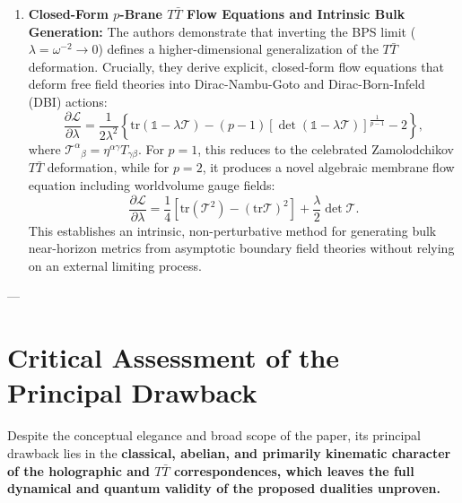 \documentclass[11pt,a4paper]{article}
\begin{document}
\begin{enumerate}
    \item \textbf{Closed-Form $p$-Brane $T\bar{T}$ Flow Equations and Intrinsic Bulk Generation:}
    The authors demonstrate that inverting the BPS limit ($\lambda = \omega^{-2} \to 0$) defines a higher-dimensional generalization of the $T\bar{T}$ deformation. Crucially, they derive explicit, closed-form flow equations that deform free field theories into Dirac-Nambu-Goto and Dirac-Born-Infeld (DBI) actions:
    \begin{equation}
        \frac{\partial \mathcal{L}}{\partial \lambda} = \frac{1}{2\lambda^2} \left\{ \mathrm{tr}(\mathbb{1} - \lambda \mathcal{T}) - (p-1) \left[ \det(\mathbb{1} - \lambda \mathcal{T}) \right]^{\frac{1}{p-1}} - 2 \right\},
    \end{equation}
    where $\mathcal{T}^\alpha{}_\beta = \eta^{\alpha\gamma} T_{\gamma\beta}$. For $p=1$, this reduces to the celebrated Zamolodchikov $T\bar{T}$ deformation, while for $p=2$, it produces a novel algebraic membrane flow equation including worldvolume gauge fields:
    \begin{equation}
        \frac{\partial \mathcal{L}}{\partial \lambda} = \frac{1}{4} \left[ \mathrm{tr}(\mathcal{T}^2) - (\mathrm{tr}\mathcal{T})^2 \right] + \frac{\lambda}{2} \det \mathcal{T}.
    \end{equation}
    This establishes an intrinsic, non-perturbative method for generating bulk near-horizon metrics from asymptotic boundary field theories without relying on an external limiting process.
\end{enumerate}

---

\section{Critical Assessment of the Principal Drawback}
Despite the conceptual elegance and broad scope of the paper, its principal drawback lies in the \textbf{classical, abelian, and primarily kinematic character of the holographic and $T\bar{T}$ correspondences, which leaves the full dynamical and quantum validity of the proposed dualities unproven.}
\end{document}
